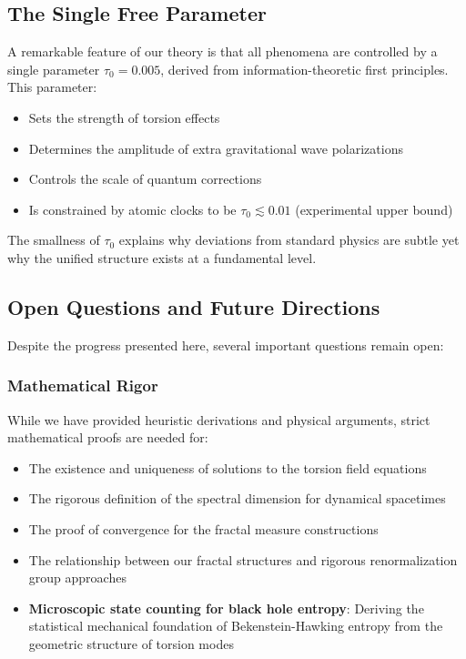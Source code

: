 \subsection{The Single Free Parameter}

A remarkable feature of our theory is that all phenomena are controlled by a single parameter $\tau_0 = 0.005$, derived from information-theoretic first principles. This parameter:

\begin{itemize}
    \item Sets the strength of torsion effects
    \item Determines the amplitude of extra gravitational wave polarizations
    \item Controls the scale of quantum corrections
    \item Is constrained by atomic clocks to be $\tau_0 \lesssim 0.01$ (experimental upper bound)
\end{itemize}

The smallness of $\tau_0$ explains why deviations from standard physics are subtle yet why the unified structure exists at a fundamental level.

\subsection{Open Questions and Future Directions}

Despite the progress presented here, several important questions remain open:

\subsubsection{Mathematical Rigor}

While we have provided heuristic derivations and physical arguments, strict mathematical proofs are needed for:
\begin{itemize}
    \item The existence and uniqueness of solutions to the torsion field equations
    \item The rigorous definition of the spectral dimension for dynamical spacetimes
    \item The proof of convergence for the fractal measure constructions
    \item The relationship between our fractal structures and rigorous renormalization group approaches
    \item \textbf{Microscopic state counting for black hole entropy}: Deriving the statistical mechanical foundation of Bekenstein-Hawking entropy from the geometric structure of torsion modes
\end{itemize}

